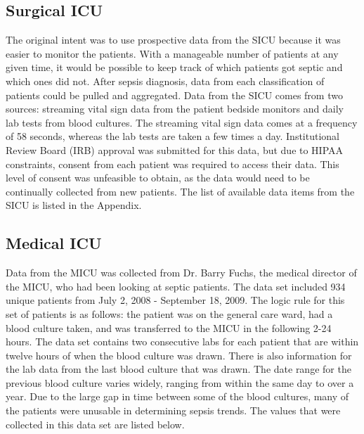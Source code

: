 \documentclass{sig-alternate}
\begin{document}
\vspace{30pt}
\subsection{Surgical ICU}
\label{subsec:sicu}
\vspace{10pt}

The original intent was to use prospective data from the SICU because it was easier to monitor the patients.  With a manageable number of patients at any given time, it would be possible to keep track of which patients got septic and which ones did not.  After sepsis diagnosis, data from each classification of patients could be pulled and aggregated.  Data from the SICU comes from two sources: streaming vital sign data from the patient bedside monitors and daily lab tests from blood cultures.  The streaming vital sign data comes at a frequency of 58 seconds, whereas the lab tests are taken a few times a day.  Institutional Review Board (IRB) approval was submitted for this data, but due to HIPAA constraints, consent from each patient was required to access their data.  This level of consent was unfeasible to obtain, as the data would need to be continually collected from new patients.  The list of available data items from the SICU is listed in the Appendix.

\vspace{10pt}
\subsection{Medical ICU}
\label{subsec:micu}
\vspace{10pt}

Data from the MICU was collected from Dr. Barry Fuchs, the medical director of the MICU, who had been looking at septic patients.  The data set included 934 unique patients from July 2, 2008 - September 18, 2009.  The logic rule for this set of patients is as follows: the patient was on the general care ward, had a blood culture taken, and was transferred to the MICU in the following 2-24 hours.  The data set contains two consecutive labs for each patient that are within twelve hours of when the blood culture was drawn.  There is also information for the lab data from the last blood culture that was drawn.  The date range for the previous blood culture varies widely, ranging from within the same day to over a year.  Due to the large gap in time between some of the blood cultures, many of the patients were unusable in determining sepsis trends.  The values that were collected in this data set are listed below.
\linebreak
\end{document}
